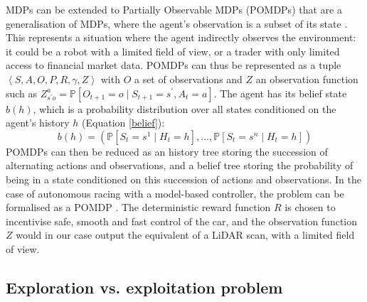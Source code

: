 MDPs can be extended to Partially Observable MDPs (POMDPs) that are a generalisation of MDPs, where the agent's observation is a subset of its state \cite{silver2015}. This represents a situation where the agent indirectly observes the environment: it could be a robot with a limited field of view, or a trader with only limited access to financial market data. POMDPs can thus be represented as a tuple $\left< S,A,O,P,R,\gamma,Z \right>$ with $O$ a set of observations and $Z$ an observation function such as $Z_{s^{'}o}^{a} = \mathbb{P}[O_{t+1}=o \mid S_{t+1} = s^{'},A_t = a]$. The agent has its belief state $b(h)$, which is a probability distribution over all states conditioned on the agent's history $h$ (Equation \ref{belief}):
\begin{equation}
\label{belief}
b(h) = (\mathbb{P}[S_t = s^{1} \mid H_t = h ],...,\mathbb{P}[S_t = s^{n} \mid H_t = h])
\end{equation}
POMDPs can then be reduced as an history tree storing the succession of alternating actions and observations, and a belief tree storing the probability of being in a state conditioned on this succession of actions and observations. \newline
In the case of autonomous racing with a model-based controller, the problem can be formalised as a POMDP \cite{modelbased}. The deterministic reward function $R$ is chosen to incentivise safe, smooth and fast control of the car, and the observation function $Z$ would in our case output the equivalent of a LiDAR scan, with a limited field of view.


\subsection{Exploration vs. exploitation problem}
\label{explovsexplo}


